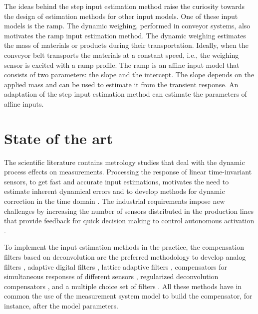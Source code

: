 The ideas behind the step input estimation method raise the curiosity towards the design of estimation methods for other input models.
One of these input models is the ramp.
The dynamic weighing, performed in conveyor systems, also motivates the ramp input estimation method.
The dynamic weighing estimates the mass of materials or products during their transportation.
Ideally, when the conveyor belt transports the materials at a constant speed, i.e., the weighing sensor is excited with a ramp profile. 
The ramp is an affine input model that consists of two parameters: the slope and the intercept.
The slope depends on the applied mass and can be used to estimate it from the transient response.
An adaptation of the step input estimation method can estimate the parameters of affine inputs.

   
 
\section{State of the art}

The scientific literature contains metrology studies that deal with the dynamic process effects on measurements.
Processing the response of linear time-invariant sensors, to get fast and accurate input estimations, motivates the need to estimate inherent dynamical errors \citep{Hessling06} and to develop methods for dynamic correction in the time domain \citep{Hessling08a}.
The industrial requirements impose new challenges by increasing the number of sensors distributed in the production lines that provide feedback for quick decision making to control autonomous activation \citep{Esward09}.  

To implement the input estimation methods in the practice, the compensation filters based on deconvolution \citep{Eichstadt10} are the preferred methodology to develop 
analog filters \citep{Jafaripanah05}, 
adaptive digital filters \citep{Shu93}, 
lattice adaptive filters \citep{Hernandez06}, 
compensators for simultaneous responses of different sensors \citep{Boschetti13}, 
regularized deconvolution compensators \citep{Dienstfrey14}, 
and a multiple choice set of filters \citep{Huang16}. 
All these methods have in common the use of the measurement system model to build the compensator, for instance, after the model parameters.



